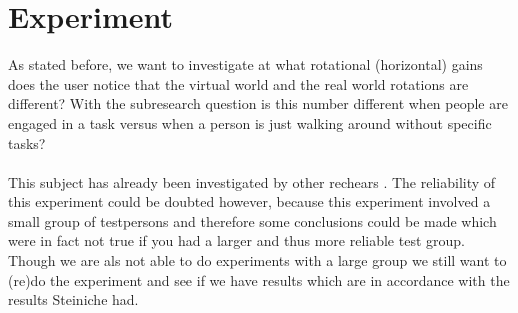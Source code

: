 \section{Experiment}


As stated before, we want to investigate at what rotational (horizontal) gains does the user notice that the virtual world and the real world rotations are different? With the subresearch question is this number different when people are engaged in a task versus when a person is just walking around without specific tasks?\\
\\
This subject has already been investigated by other rechears \cite{steinicke2}. The reliability of this experiment could be doubted however, because this experiment involved a small group of testpersons and therefore some conclusions could be made which were in fact not true if you had a larger and thus more reliable test group. Though we are als not able to do experiments with a large group we still want to (re)do the experiment and see if we have results which are in accordance with the results Steiniche had.


